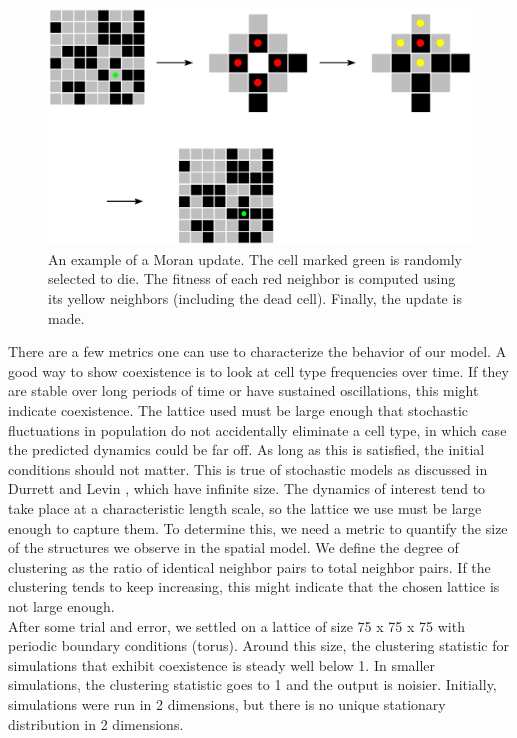 \documentclass[12pt]{report}
\begin{document}
\begin{figure}
\centering
\includegraphics[width = \linewidth]{Diagrams/General/themodel}
\caption{An example of a Moran update. The cell marked green is randomly selected to die. The fitness of each red neighbor is computed using its yellow neighbors (including the dead cell). Finally, the update is made.}
\end{figure}

There are a few metrics one can use to characterize the behavior of our model. A good way to show coexistence is to look at cell type frequencies over time. If they are stable over long periods of time or have sustained oscillations, this might indicate coexistence. The lattice used must be large enough that stochastic fluctuations in population do not accidentally eliminate a cell type, in which case the predicted dynamics could be far off. As long as this is satisfied, the initial conditions should not matter. This is true of stochastic models as discussed in Durrett and Levin \cite{Durrett1994}, which have infinite size. The dynamics of interest tend to take place at a characteristic length scale, so the lattice we use must be large enough to capture them. To determine this, we need a metric to quantify the size of the structures we observe in the spatial model. We define the degree of clustering as the ratio of identical neighbor pairs to total neighbor pairs. If the clustering tends to keep increasing, this might indicate that the chosen lattice is  not large enough.\\

After some trial and error, we settled on a lattice of size 75 x 75 x 75 with periodic boundary conditions (torus). Around this size, the clustering statistic for simulations that exhibit coexistence is steady well below 1. In smaller simulations, the clustering statistic goes to 1 and the output is noisier. Initially, simulations were run in 2 dimensions, but there is no unique stationary distribution in 2 dimensions.\\
\end{document}
